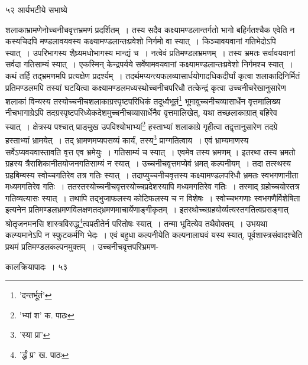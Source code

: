 \documentclass[11pt, openany]{book}
\begin{document}
{{{{{\newpage

\vspace{3cm} ५२\hspace{4cm} आर्यभटीये सभाष्ये

\vspace{0.3cm}
\noindent शलाकाभ्रामणेनोच्चनीचवृत्तभ्रमणं प्रदर्शितम्~। तस्य सदैव कक्ष्यामण्डलान्तर्गतो भागो बहिर्गतश्चैक एवेति न कस्यचिदपि मण्डलावयवस्य कक्ष्यामण्डलान्तःप्रवेशो निर्गमो वा स्यात्~। किञ्चावयवानां गतिभेदोऽपि स्यात्~। उपरिभागस्य शैघ्र्यमधोभागस्य मान्द्यं च~। नत्वेवं प्रतिमण्डलभ्रमणम्~। तस्य भ्रमतः सर्वावयवानां सर्वदा गतिसाम्यं स्यात्~। एकस्मिन् केन्द्रपर्यये सर्वेषामवयवानां कक्ष्यामण्डलान्तःप्रवेशो निर्गमश्च स्यात्~। कथं तर्हि तद्भ्रमणमपि प्रत्यक्षेण प्रदर्श्यम्~। तदर्थमप्यन्त्यफलव्यासार्धयोगादधिकदीर्घां कृत्वा शलाकादिनिर्मितं प्रतिमण्डलमपि तस्यां घटयित्वा कक्ष्यामण्डलमध्यस्थोच्चनीचपरिधौ तत्केन्द्रं कृत्वा उच्चनीचरेखानुसारेण शलाकां विन्यस्य तस्योच्चनीचशलाकाग्रस्पृष्टपरिधिकं तदूर्ध्वभूतं\renewcommand{\thefootnote}{१}\footnote{'दन्तर्भूतं'} भूमावुच्चनीचव्यासार्धेन वृत्तमालिख्य नीचभागाग्रेऽपि तदग्रस्पृष्टपरिध्येकदेशमुच्चनीचव्यासार्धेनैव वृत्तमालिखेत्, यथा तच्छलाकाग्रात् बहिरेव स्यात्~। क्षेत्रस्य पश्चात् प्राङ्मुख उपविश्योभाभ्यां\renewcommand{\thefootnote}{२}\footnote{'भ्यां श' क. पाठः} हस्ताभ्यां शलाकाग्रे गृहीत्वा तद्वृत्तानुसारेण तदग्रे हस्ताभ्यां भ्रामयेत्~। तद् भ्रामणमप्यपसव्यं कार्यं, तस्य\renewcommand{\thefootnote}{३}\footnote{'स्या प्रा'} प्राग्गतित्वाय~। एवं भ्राम्यमाणस्य सर्वेऽप्यवयवास्तावति वृत्त
एव भ्रमेयुः~। गतिसाम्यं च स्यात्~। एवमेव तस्य भ्रमणम् । इतरथा तस्य भ्रमतो ग्रहस्य त्रैराशिकानीतयोजनगतिसाम्यं न स्यात्~। उच्चनीचवृत्तमप्येवं भ्रमत् कल्पनीयम्~। तदा तत्स्थस्य ग्रहबिम्बस्य स्वोच्चगतिरेव तत्र गतिः स्यात्~। तदाप्युच्चनीचवृत्तस्य कक्ष्यामण्डलपरिधौ भ्रमतः स्वभगणानीता मध्यमगतिरेव गतिः~। ततस्तस्योच्चनीचवृत्तस्योच्चप्रदेशस्यापि मध्यमगतिरेव गतिः~। तस्माद् ग्रहोच्चयोस्तत्र गतिव्यत्यासः स्यात्~। तथापि तद्भुजाफलस्य कोटिफलस्य च न विशेषः~। {\qt स्वोच्चभगणाः स्वभगणैर्विशेषिता}
इत्यनेन प्रतिमण्डलभ्रमणविलक्षणतद्भ्रमणमाचार्येणाङ्गीकृतम्~। इतरथोच्चग्रहयोर्व्यत्यस्तगतित्वप्रसङ्गात् श्रोतृजनमनसि
शास्त्रविरुद्ध\renewcommand{\thefootnote}{४}\footnote{'र्द्धं प्र' ख. पाठः}त्वप्रतीतेर्न परितोषः स्यात्~। तन्मा भूदित्येव तथैवोक्तम्~। उभयथा कल्प्यमानेऽपि न स्फुटकर्मणि भेदः~। एवं बहुधा कल्पनीयेति कल्पनालाघवं यस्य स्यात्, पूर्वशास्त्रसंवादश्चेति प्रथमं प्रतिमण्डलकल्पनमुक्तम्~। उच्चनीचवृत्तपरिभ्रमण-

\newpage


\vspace{3cm} \hspace{4cm}कालक्रियापादः~।\hspace{4cm} ५३

}}}}}
\end{document}
